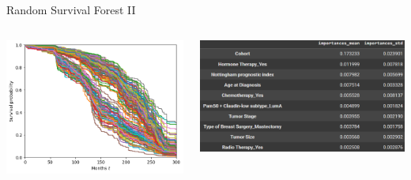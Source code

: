 \documentclass{beamer}
\begin{document}
\begin{frame}{Random Survival Forest II}
    \begin{columns}
        \begin{column}{0.49 \textwidth}
            \centering
            \includegraphics[width = \textwidth]{images/rsf_sf.png}
        \end{column}
        \begin{column}{0.49 \textwidth}
            \centering
            \includegraphics[width = \textwidth]{images/rsf_fi.png}
        \end{column}
    \end{columns}
\end{frame}
\end{document}
